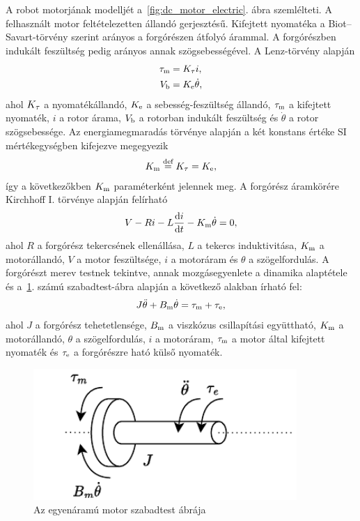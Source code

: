 A robot motorjának modelljét a~\ref{fig:dc_motor_electric}. ábra szemlélteti. 
A felhasznált motor feltételezetten állandó gerjesztésű. Kifejtett nyomatéka a 
Biot--Savart-törvény szerint arányos a forgórészen átfolyó árammal. A forgórészben
indukált feszültség pedig arányos annak szögsebességével. A Lenz-törvény alapján 
\begin{equation}\label{eq:lenz_torque}
\begin{split}
    \tau_{\mathrm{m}} &= K_{\mathrm{\tau}} i, \\
    V_{\mathrm{b}} &= K_{\mathrm{e}} \dot\theta,
\end{split}
\end{equation}
ahol $K_{\mathrm{\tau}}$ a nyomatékállandó, $K_{\mathrm{e}}$ a sebesség-feszültség állandó, $\tau_{\mathrm{m}}$ a kifejtett 
nyomaték, $i$ a rotor árama, $V_{\mathrm{b}}$ a rotorban indukált feszültség és $\dot\theta$ a rotor szögsebessége.
Az energiamegmaradás törvénye alapján a két konstans értéke SI mértékegységben kifejezve megegyezik
\begin{align}
    K_{\mathrm{m}} \stackrel{\text{def}}{=} K_{\mathrm{\tau}} = K_{\mathrm{e}},
\end{align}
így a következőkben $K_{\mathrm{m}}$ paraméterként jelennek meg. A forgórész áramkörére Kirchhoff I. törvénye alapján felírható
\begin{align}\label{eq:armature_circuit}
    V - Ri - L\frac{\mathrm{d} i}{\mathrm{d} t} - K_{\mathrm{m}}\dot\theta = 0,
\end{align}
ahol $R$ a forgórész tekercsének ellenállása, $L$ a tekercs induktivitása, 
$K_{\mathrm{m}}$ a motorállandó, $V$ a motor feszültsége, $i$ a motoráram és $\theta$ a szögelfordulás.
A forgórészt merev testnek tekintve, annak mozgásegyenlete a dinamika alaptétele és a~\ref{fig:dc_motor_mechanical}. számú 
szabadtest-ábra alapján a következő alakban írható fel:
\begin{align}\label{eq:rotor_dynamics}
    J\ddot\theta + B_{\mathrm{m}}\dot\theta = \tau_{\mathrm{m}} + \tau_{\mathrm{e}},
\end{align}
ahol $J$ a forgórész tehetetlensége, $B_{\mathrm{m}}$ a viszkózus csillapítási együttható, 
$K_{\mathrm{m}}$ a motorállandó, $\theta$ a szögelfordulás, $i$ a motoráram, $\tau_{\mathrm{m}}$ a motor által kifejtett nyomaték 
és $\tau_{\mathrm{e}}$ a forgórészre ható külső nyomaték. 

\begin{figure}[t!]
	\begin{center}
		\includegraphics[width=10cm]{images/motor_model_mechanical.pdf}
		\caption{Az egyenáramú motor szabadtest ábrája}
		\label{fig:dc_motor_mechanical}
	\end{center}
\end{figure}
    
